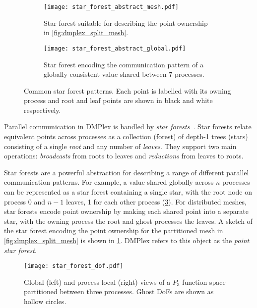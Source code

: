 \documentclass[thesis]{subfiles}
\begin{document}
\begin{figure}
  \centering
  \begin{subfigure}[t]{.45\textwidth}
    \centering
    \texttt{[image: star\_forest\_abstract\_mesh.pdf]}
    \caption{Star forest suitable for describing the point ownership in \cref{fig:dmplex_split_mesh}.}
    \label{fig:star_forest_abstract_mesh}
  \end{subfigure}
  \hspace{1em}
  \begin{subfigure}[t]{.45\textwidth}
    \centering
    \texttt{[image: star\_forest\_abstract\_global.pdf]}
    \caption{Star forest encoding the communication pattern of a globally consistent value shared between 7 processes.}
    \label{fig:star_forest_abstract_global}
  \end{subfigure}
  \caption{
    Common star forest patterns.
    Each point is labelled with its owning process and root and leaf points are shown in black and white respectively.
  }
\end{figure}

Parallel communication in DMPlex is handled by \emph{star forests}~\cite{zhangPetscSFScalableCommunication2021}.
Star forests relate equivalent points across processes as a collection (forest) of depth-1 trees (stars) consisting of a single \emph{root} and any number of \emph{leaves}.
They support two main operations: \emph{broadcasts} from roots to leaves and \emph{reductions} from leaves to roots.

Star forests are a powerful abstraction for describing a range of different parallel communication patterns.
For example,  a value shared globally across $n$ processes can be represented as a star forest containing a single star, with the root node on process 0 and $n-1$ leaves, 1 for each other process (\cref{fig:star_forest_abstract_global}).
For distributed meshes, star forests encode point ownership by making each shared point into a separate star, with the owning process the root and ghost processes the leaves.
A sketch of the star forest encoding the point ownership for the partitioned mesh in \cref{fig:dmplex_split_mesh} is shown in \cref{fig:star_forest_abstract_mesh}.
DMPlex refers to this object as the \emph{point star forest}.

\begin{figure}
  \centering
  \texttt{[image: star\_forest\_dof.pdf]}

  \caption{
    Global (left) and process-local (right) views of a $P_3$ function space partitioned between three processes.
    Ghost DoFs are shown as hollow circles.
  }
  \label{fig:dmplex_split_function_space}
\end{figure}
\end{document}
